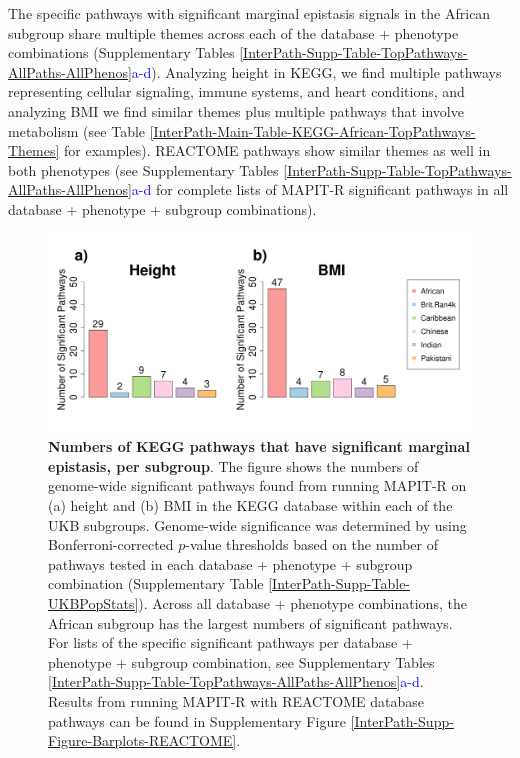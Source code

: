\documentclass[12pt,a4paper]{article}
\begin{document}
The specific pathways with significant marginal epistasis signals in the African subgroup share multiple themes across each of the database + phenotype combinations (Supplementary Tables \ref{InterPath-Supp-Table-TopPathways-AllPaths-AllPhenos}\textcolor{blue}{a-d}). Analyzing height in KEGG, we find multiple pathways representing cellular signaling, immune systems, and heart conditions, and analyzing BMI we find similar themes plus multiple pathways that involve metabolism (see Table \ref{InterPath-Main-Table-KEGG-African-TopPathways-Themes} for examples). REACTOME pathways show similar themes as well in both phenotypes (see Supplementary Tables \ref{InterPath-Supp-Table-TopPathways-AllPaths-AllPhenos}\textcolor{blue}{a-d} for complete lists of MAPIT-R significant pathways in all database + phenotype + subgroup combinations).  


\begin{figure}[htb]
\centering
\hspace*{-.9cm}
\includegraphics[scale=.45]{Images/Main/InterPath_Main_Figure_Barplots_KEGG_vs4.png}
\caption[TBD]{\textbf{Numbers of KEGG pathways that have significant marginal epistasis, per subgroup}. The figure shows the numbers of genome-wide significant pathways found from running MAPIT-R on (a) height and (b) BMI in the KEGG database within each of the UKB subgroups.  Genome-wide significance was determined by using Bonferroni-corrected $p$-value thresholds based on the number of pathways tested in each database + phenotype + subgroup combination (Supplementary Table \ref{InterPath-Supp-Table-UKBPopStats}). Across all database + phenotype combinations, the African subgroup has the largest numbers of significant pathways. For lists of the specific significant pathways per database + phenotype + subgroup combination, see Supplementary Tables \ref{InterPath-Supp-Table-TopPathways-AllPaths-AllPhenos}\textcolor{blue}{a-d}. Results from running MAPIT-R with REACTOME database pathways can be found in Supplementary Figure \ref{InterPath-Supp-Figure-Barplots-REACTOME}.}
\label{InterPath-Main-Figure-Barplots-KEGG}
\end{figure}
\end{document}
